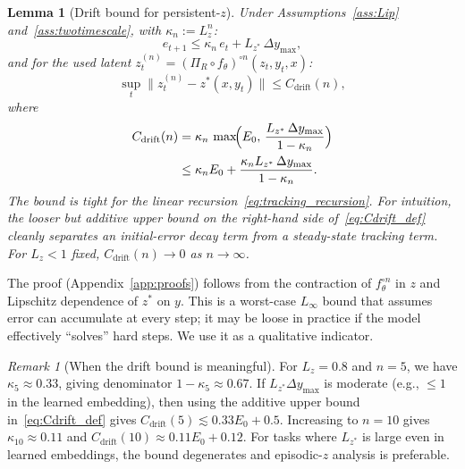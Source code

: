 \documentclass{article}
\theoremstyle{plain}
\newtheorem{lemma}[theorem]{Lemma}
\theoremstyle{definition}
\theoremstyle{remark}
\newtheorem{remark}[theorem]{Remark}
\newcommand{\Cdrift}{C_{\mathrm{drift}}}
\begin{document}
\begin{lemma}[Drift bound for persistent-$z$]
\label{lem:drift_bound}
Under Assumptions~\ref{ass:Lip} and~\ref{ass:twotimescale}, with $\kappa_n := L_z^n$:
\begin{equation}
e_{t+1} \le \kappa_n\,e_t + L_{z^*}\,\Delta y_{\max},
\label{eq:tracking_recursion}
\end{equation}
and for the used latent $z_t^{(n)} = (\Pi_R \circ f_\theta)^{\circ n}(z_t,y_t,x)$:
\begin{equation}
\sup_t \bigl\|z_t^{(n)} - z^*(x,y_t)\bigr\| \le \Cdrift(n),
\end{equation}
where
\begin{equation}
\begin{split}
\Cdrift(n)
&= \kappa_n\,\max\!\Bigl(E_0,\,\frac{L_{z^*}\,\Delta y_{\max}}{1-\kappa_n}\Bigr) \\
&\le \kappa_n E_0 + \frac{\kappa_n L_{z^*}\,\Delta y_{\max}}{1-\kappa_n}.
\end{split}
\label{eq:Cdrift_def}
\end{equation}
The bound is tight for the linear recursion~\eqref{eq:tracking_recursion}.
For intuition, the looser but additive upper bound on the right-hand side of~\eqref{eq:Cdrift_def} cleanly separates an initial-error decay term from a steady-state tracking term.
For $L_z<1$ fixed, $\Cdrift(n) \to 0$ as $n\to\infty$.
\end{lemma}

The proof (Appendix~\ref{app:proofs}) follows from the contraction of $f_\theta^{\circ n}$ in $z$ and Lipschitz dependence of $z^*$ on $y$.
This is a worst-case $L_\infty$ bound that assumes error can accumulate at every step; it may be loose in practice if the model effectively ``solves'' hard steps.
We use it as a qualitative indicator.

\begin{remark}[When the drift bound is meaningful]
\label{rem:drift_meaningful}
For $L_z = 0.8$ and $n = 5$, we have $\kappa_5 \approx 0.33$, giving denominator $1 - \kappa_5 \approx 0.67$.
If $L_{z^*} \Delta y_{\max}$ is moderate (e.g., $\le 1$ in the learned embedding), then using the additive upper bound in~\eqref{eq:Cdrift_def} gives $\Cdrift(5) \lesssim 0.33 E_0 + 0.5$.
Increasing to $n = 10$ gives $\kappa_{10} \approx 0.11$ and $\Cdrift(10) \approx 0.11 E_0 + 0.12$.
For tasks where $L_{z^*}$ is large even in learned embeddings, the bound degenerates and episodic-$z$ analysis is preferable.
\end{remark}
\end{document}
